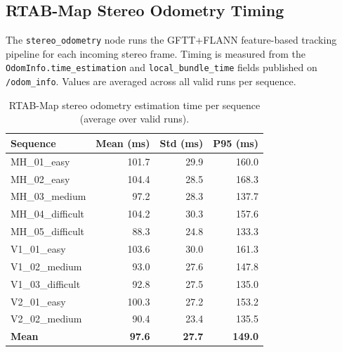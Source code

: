 \documentclass[11pt]{article}
\begin{document}
\subsection{RTAB-Map Stereo Odometry Timing}

The \texttt{stereo\_odometry} node runs the GFTT+FLANN feature-based tracking pipeline for each incoming stereo frame. Timing is measured from the \texttt{OdomInfo.time\_estimation} and \texttt{local\_bundle\_time} fields published on \texttt{/odom\_info}. Values are averaged across all valid runs per sequence.

\begin{table}[H]
\centering
\small
\caption{RTAB-Map stereo odometry estimation time per sequence (average over valid runs).}
\label{tab:rtabmap_timing_odom}
\begin{tabular}{lrrr}
\toprule
Sequence & Mean (ms) & Std (ms) & P95 (ms) \\
\midrule
MH\_01\_easy       & 101.7 & 29.9 & 160.0 \\
MH\_02\_easy       & 104.4 & 28.5 & 168.3 \\
MH\_03\_medium     & 97.2  & 28.3 & 137.7 \\
MH\_04\_difficult  & 104.2 & 30.3 & 157.6 \\
MH\_05\_difficult  & 88.3  & 24.8 & 133.3 \\
V1\_01\_easy       & 103.6 & 30.0 & 161.3 \\
V1\_02\_medium     & 93.0  & 27.6 & 147.8 \\
V1\_03\_difficult  & 92.8  & 27.5 & 135.0 \\
V2\_01\_easy       & 100.3 & 27.2 & 153.2 \\
V2\_02\_medium     & 90.4  & 23.4 & 135.5 \\
\midrule
\textbf{Mean}      & \textbf{97.6} & \textbf{27.7} & \textbf{149.0} \\
\bottomrule
\end{tabular}
\end{table}
\end{document}
